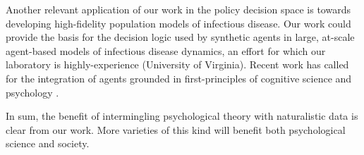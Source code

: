 Another relevant application of our work in the policy decision space is towards developing high-fidelity population models of infectious disease.  Our work could provide the basis for the decision logic used by synthetic agents in large, at-scale agent-based models of infectious disease dynamics, an effort for which our laboratory is highly-experience (University of Virginia).  Recent work has called for the integration of agents grounded in first-principles of cognitive science and psychology \citep{orrAttPolar2021,afrasiabi2019evaluating,orr2019multi,bhattacharya2019matrix,orrCovid19}.

In sum, the benefit of intermingling psychological theory with naturalistic data is clear from our work.  More varieties of this kind will benefit both psychological science and society.  
